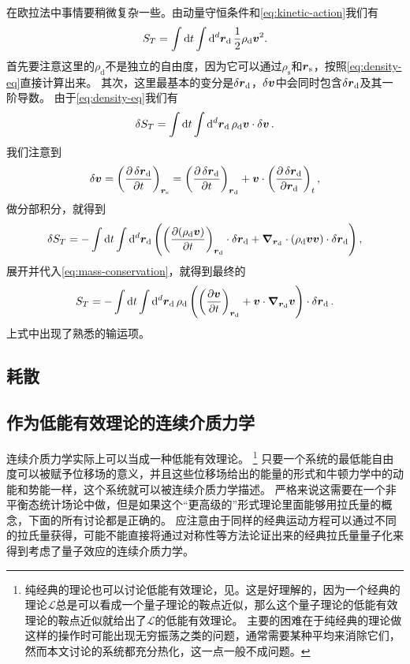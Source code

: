 在欧拉法中事情要稍微复杂一些。由动量守恒条件和\eqref{eq:kinetic-action}我们有
\begin{equation}
    S_T = \int \dd{t} \int \dd[d]{\vb*{r}_\text{d}} \frac{1}{2} \rho_\text{d} \vb*{v}^2.
\end{equation}
首先要注意这里的$\rho_\text{d}$不是独立的自由度，因为它可以通过$\rho_\text{s}$和$\vb*{r}_\text{s}$，按照\eqref{eq:density-eq}直接计算出来。
其次，这里最基本的变分是$\var{\vb*{r}_\text{d}}$，$\var{\vb*{v}}$中会同时包含$\var{\vb*{r}_\text{d}}$及其一阶导数。
由于\eqref{eq:density-eq}我们有
\[
    \var{S_T} = \int \dd{t} \int \dd[d]{\vb*{r}_\text{d}} \rho_\text{d} \vb*{v} \cdot \var{\vb*{v}}.
\]
我们注意到
\[
    \var{\vb*{v}} = \left( \pdv{\var{\vb*{r}_\text{d}}}{t} \right)_{\vb*{r}_\text{s}} = \left( \pdv{\var{\vb*{r}_\text{d}}}{t} \right)_{\vb*{r}_\text{d}} + \vb*{v} \cdot \left(\pdv{\var{\vb*{r}_\text{d}}}{\vb*{r}_\text{d}}\right)_t,
\]
做分部积分，就得到
\[
    \var{S_T} = - \int \dd{t} \int \dd[d]{\vb*{r}_\text{d}} \left( \left(\pdv{(\rho_\text{d} \vb*{v})}{t}\right)_{\vb*{r}_\text{d}} \cdot \var{\vb*{r}_\text{d}} + \grad_{\vb*{r}_\text{d}} \cdot (\rho_\text{d} \vb*{v} \vb*{v}) \cdot \var{\vb*{r}_\text{d}} \right),
\]
展开并代入\eqref{eq:mass-conservation}，就得到最终的
\begin{equation}
    S_T = - \int \dd{t} \int \dd[d]{\vb*{r}_\text{d}}  \rho_\text{d} \left( \left(\pdv{\vb*{v}}{t}\right)_{\vb*{r}_\text{d}} + \vb*{v} \cdot \grad_{\vb*{r}_\text{d}} \vb*{v} \right) \cdot \var{\vb*{r}_\text{d}}.
\end{equation}
上式中出现了熟悉的输运项。

\subsection{耗散}

\subsection{作为低能有效理论的连续介质力学}

连续介质力学实际上可以当成一种低能有效理论。%
\footnote{
    纯经典的理论也可以讨论低能有效理论，见\cite{reall2021effective}。这是好理解的，因为一个经典的理论$\mathcal{L}$总是可以看成一个量子理论的鞍点近似，那么这个量子理论的低能有效理论的鞍点近似就给出了$\mathcal{L}$的低能有效理论。
    主要的困难在于纯经典的理论做这样的操作时可能出现无穷振荡之类的问题，通常需要某种平均来消除它们，然而本文讨论的系统都充分热化，这一点一般不成问题。
}%
只要一个系统的最低能自由度可以被赋予位移场的意义，并且这些位移场给出的能量的形式和牛顿力学中的动能和势能一样，这个系统就可以被连续介质力学描述。
严格来说这需要在一个非平衡态统计场论中做，但是如果这个“更高级的”形式理论里面能够用拉氏量的概念，下面的所有讨论都是正确的。
应注意由于同样的经典运动方程可以通过不同的拉氏量获得，可能不能直接将通过对称性等方法论证出来的经典拉氏量量子化来得到考虑了量子效应的连续介质力学。

